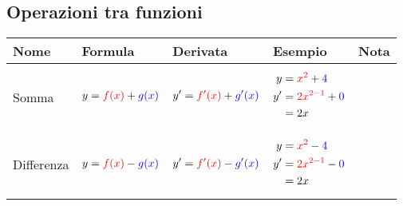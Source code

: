 \documentclass[../../main]{subfiles}
\begin{document}
\subsection{Operazioni tra funzioni}
\begin{center}
        \label{tab:derivate:operazioni}
        \begin{longtable}{ |p{5em} | p{5em} | p{5em} | p{7em} | p{2cm}| }
            \hhline{|=|=|=|=|=|}
            Nome & Formula & Derivata & Esempio & Nota \\
            
            \hline
            
            \begin{center}
                Somma
            \end{center} &
            \begin{align*}
                y= {\color{red}f(x)} + {\color{blue}g(x)} 
            \end{align*}  &
            \begin{align*}
                y'= {\color{red}f'(x)} + {\color{blue}g'(x)} 
            \end{align*} &
            {
                \begin{align*}
                    y  &= {\color{red}x^2} + {\color{blue}4}    \\
                    y' &= {\color{red}2x^{2-1}} + {\color{blue}0}  \\
                        &= 2x  
                \end{align*}
            } &
            \begin{center}
            \end{center} \\ 

            \hline
            
            \begin{center}
                Differenza
            \end{center} &
            \begin{align*}
                y= {\color{red}f(x)} - {\color{blue}g(x)} 
            \end{align*}  &
            \begin{align*}
                y'= {\color{red}f'(x)} - {\color{blue}g'(x)} 
            \end{align*} &
            {
                \begin{align*}
                    y  &= {\color{red}x^2} - {\color{blue}4}    \\
                    y' &= {\color{red}2x^{2-1}} - {\color{blue}0}  \\
                        &= 2x  
                \end{align*}
            } &
            \begin{center}
            \end{center} \\ 


\end{longtable}
\end{center}
\end{document}
